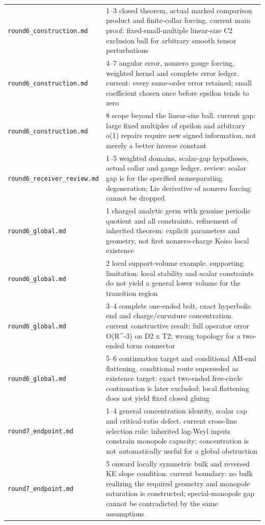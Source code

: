 \documentclass[UTF8,fontset=fandol,zihao=-4]{ctexart}
\theoremstyle{cn}
\begin{document}
\begin{longtable}{L{.34\textwidth}L{.59\textwidth}}
\nolinkurl{round6_construction.md} & 1–3 closed theorem, actual marked comparison product and finite-collar forcing. current main proof: fixed-small-multiple linear-size C2 exclusion ball for arbitrary smooth tensor perturbations\\
\nolinkurl{round6_construction.md} & 4–7 angular error, nonzero gauge forcing, weighted kernel and complete error ledger. current: every same-order error retained; small coefficient chosen once before epsilon tends to zero\\
\nolinkurl{round6_construction.md} & 8 scope beyond the linear-size ball. current gap: large fixed multiples of epsilon and arbitrary o(1) repairs require new signed information, not merely a better inverse constant\\
\nolinkurl{round6_receiver_review.md} & 1–5 weighted domains, scalar-gap hypotheses, actual collar and gauge ledger. review: scalar gap is for the specified nonseparating degeneration; Lie derivative of nonzero forcing cannot be dropped\\
\nolinkurl{round6_global.md} & 1 charged analytic germ with genuine periodic quotient and all constraints. refinement of inherited theorem: explicit parameters and geometry, not first nonzero-charge Koiso local existence\\
\nolinkurl{round6_global.md} & 2 local support-volume example. supporting limitation: local stability and scalar constraints do not yield a general lower volume for the transition region\\
\nolinkurl{round6_global.md} & 3–4 complete one-ended bolt, exact hyperbolic end and charge/curvature concentration. current constructive result: full operator error O(R\textasciicircum{}-3) on D2 x T2; wrong topology for a two-ended torus connector\\
\nolinkurl{round6_global.md} & 5–6 continuation target and conditional AH-end flattening. conditional route superseded as existence target: exact two-ended free-circle continuation is later excluded; local flattening does not yield fixed closed gluing\\
\nolinkurl{round7_endpoint.md} & 1–4 general concentration identity, scalar cap and critical-ratio defect. current cross-line selection rule: inherited log-Weyl inputs constrain monopole capacity; concentration is not automatically useful for a global obstruction\\
\nolinkurl{round7_endpoint.md} & 5 onward locally symmetric bulk and reversed KE slope condition. current boundary: no bulk realizing the required geometry and monopole saturation is constructed; special-monopole gap cannot be contradicted by the same assumptions\\

\end{longtable}
\end{document}
